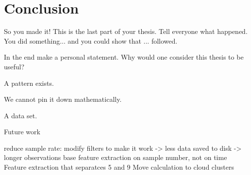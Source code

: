 \chapter{Conclusion}\label{chapter:conclusion} \label{ch:conclusions}
So you made it!
This is the last part of your thesis.
Tell everyone what happened.
You did something... and you could show that ... followed.

In the end make a personal statement.
Why would one consider this thesis to be useful?


A pattern exists.

We cannot pin it down mathematically.

A data set.



Future work

reduce sample rate: modify filters to make it work -> less data saved to disk -> longer observations
base feature extraction on sample number, not on time
Feature extraction that separatces 5 and 9
Move calculation to cloud clusters
